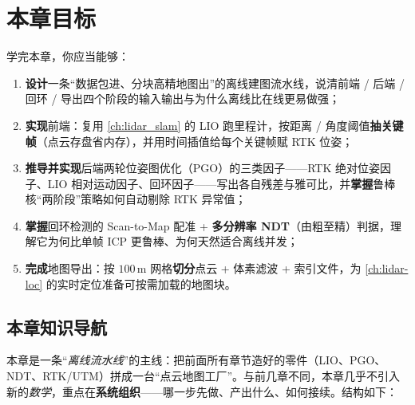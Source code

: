 \section*{本章目标}
学完本章，你应当能够：
\begin{enumerate}
  \item \textbf{设计}一条“数据包进、分块高精地图出”的离线建图流水线，说清前端 / 后端 / 回环 / 导出四个阶段的输入输出与为什么离线比在线更易做强；
  \item \textbf{实现}前端：复用 \cref{ch:lidar_slam} 的 LIO 跑里程计，按距离 / 角度阈值\textbf{抽关键帧}（点云存盘省内存），并用时间插值给每个关键帧赋 RTK 位姿；
  \item \textbf{推导并实现}后端两轮位姿图优化（PGO）的三类因子——RTK 绝对位姿因子、LIO 相对运动因子、回环因子——写出各自残差与雅可比，并\textbf{掌握}鲁棒核“两阶段”策略如何自动剔除 RTK 异常值；
  \item \textbf{掌握}回环检测的 Scan-to-Map 配准 + \textbf{多分辨率 NDT}（由粗至精）判据，理解它为何比单帧 ICP 更鲁棒、为何天然适合离线并发；
  \item \textbf{完成}地图导出：按 $100$\,m 网格\textbf{切分}点云 + 体素滤波 + 索引文件，为 \cref{ch:lidar-loc} 的实时定位准备可按需加载的地图块。
\end{enumerate}

\subsection*{本章知识导航}
本章是一条“\emph{离线流水线}”的主线：把前面所有章节造好的零件（LIO、PGO、NDT、RTK/UTM）拼成一台“点云地图工厂”。与前几章不同，本章几乎不引入新的\emph{数学}，重点在\textbf{系统组织}——哪一步先做、产出什么、如何接续。结构如下：

